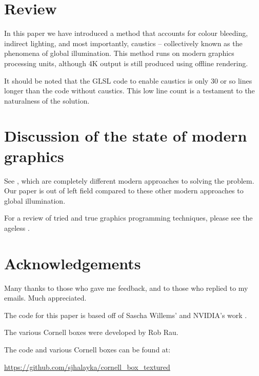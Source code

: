 \documentclass[12pt]{article}
\begin{document}
\section{Review}

In this paper we have introduced a method that accounts for colour bleeding, indirect lighting, and most importantly, caustics -- collectively known as the phenomena of global illumination.
This method runs on modern graphics processing units, although 4K output is still produced using offline rendering.

It should be noted that the GLSL code to enable caustics is only $30$ or so lines longer than the code without caustics.
This low line count is a testament to the naturalness of the solution.





\section{Discussion of the state of modern graphics}

See \cite{moreau, komarov, gruen, yang}, which are completely different modern approaches to solving the problem.
Our paper is out of left field compared to these other modern approaches to global illumination.

For a review of tried and true graphics programming techniques, please see the ageless \cite{pharr}.








\section{Acknowledgements}

Many thanks to those who gave me feedback, and to those who replied to my emails.
Much appreciated.

The code for this paper is based off of Sascha Willems' and NVIDIA's work \cite{willems1, willems2, nvidia}.

The various Cornell boxes were developed by Rob Rau.

The code and various Cornell boxes can be found at: 

\url{https://github.com/sjhalayka/cornell_box_textured}




\pagebreak
\end{document}
